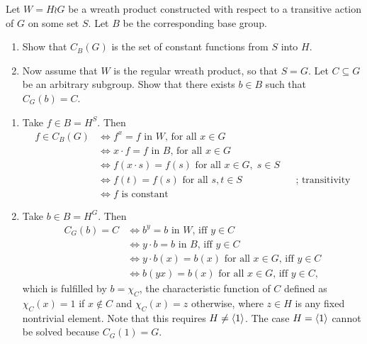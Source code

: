 \begin{solution}
\begin{probl}
    Let\/ $W = H \wr G$ be a wreath product constructed with respect to a transitive action of\/ $G$ on some set\/ $S$. Let\/ $B$ be the corresponding base group.

    \begin{enumerate}[\rm a)]
        \item Show that\/ $C_B(G)$ is the set of constant functions from\/ $S$ into\/ $H$.
        \item Now assume that\/ $W$ is the regular wreath product, so that\/ $S = G$. Let\/ $C \subseteq G$ be an arbitrary subgroup. Show that there exists\/ $b \in B$ such that\/ $C_G(b) = C$.
    \end{enumerate}
\end{probl}

\begin{solution}
\begin{enumerate}[\rm a)]
    \item Take $f\in B=H^S$. Then
    \begin{align*}
        f\in C_B(G) &\iff f^x=f\text{ in $W$, for all }x\in G\\
            &\iff x\cdot f= f\text{ in $B$, for all }x\in G\\
            &\iff f(x\cdot s)=f(s)\text{ for all }x\in G,\;s\in S\\
            &\iff f(t)=f(s)\text{ for all }s,t\in S&&\text{; transitivity}\\
            &\iff f\text{ is constant}
    \end{align*}

    \item Take $b\in B=H^G$. Then
    \begin{align*}
        C_G(b) = C &\iff b^y=b\text{ in $W$, iff }y\in C\\
            &\iff y\cdot b= b\text{ in $B$, iff }y\in C\\
            &\iff y\cdot b(x)=b(x)\text{ for all $x\in G$, iff }y\in C\\
            &\iff b(yx) = b(x)\text{ for all $x\in G$, iff }y\in C,
    \end{align*}
    which is fulfilled by $b=\chi_C$, the characteristic function of $C$ defined as $\chi_C(x)=1$ if $x\notin C$ and $\chi_C(x)=z$ otherwise, where $z\in H$ is any fixed nontrivial element. Note that this requires $H\ne\langle1\rangle$. The case $H=\langle1\rangle$ cannot be solved because $C_G(1)=G$.
\end{enumerate}
\end{solution}


\end{solution}
